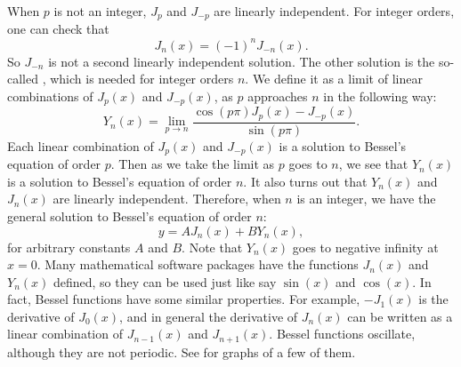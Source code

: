 When $p$ is not an integer, $J_p$
and $J_{-p}$ are linearly independent.
For integer orders, one can check that
\begin{equation*}
J_n(x) = {(-1)}^nJ_{-n}(x) .
\end{equation*}
So $J_{-n}$ is not a second linearly independent
solution.  The other solution is the
so-called \emph{},
which is needed for integer orders $n$.
We define it
as a limit of linear combinations of $J_p(x)$ and $J_{-p}(x)$, as
$p$ approaches $n$ in the
following way:
\begin{equation*}
Y_n(x) = \lim_{p\to n} \frac{\cos(p \pi) J_p(x) - J_{-p}(x)}{\sin(p \pi)} .
\end{equation*}
Each linear combination of $J_p(x)$ and $J_{-p}(x)$ is a solution
to Bessel's equation of order $p$.  Then as we take the limit as $p$
goes to $n$, we see that $Y_n(x)$ is a solution to Bessel's equation of
order $n$.  It also turns out that $Y_n(x)$ and $J_n(x)$ are linearly
independent.  Therefore, when $n$ is an integer, we have the
general solution to Bessel's equation of order $n$:
\begin{equation*}
y = A J_n(x) + B Y_n(x) ,
\end{equation*}
for arbitrary constants $A$ and $B$.  Note that
$Y_n(x)$ goes to negative infinity at $x=0$.   Many mathematical software
packages have
the functions $J_n(x)$ and $Y_n(x)$ defined, so they can be used
just like say $\sin(x)$ and $\cos(x)$.  In fact, Bessel functions
have some similar 
properties.  For example, $-J_1(x)$ is the derivative of $J_0(x)$, and
in general the derivative of $J_n(x)$ can be written as a linear
combination of $J_{n-1}(x)$ and $J_{n+1}(x)$.  Bessel
functions oscillate, although they are not periodic.  See
 for graphs of a few of them.
\begin{myfig}
\capstart
\caption{Plot of $J_0(x)$ and $J_1(x)$ in the first graph
and $Y_0(x)$ and $Y_1(x)$ in the second graph.\label{bessel:graphsfig}}
\end{myfig}


